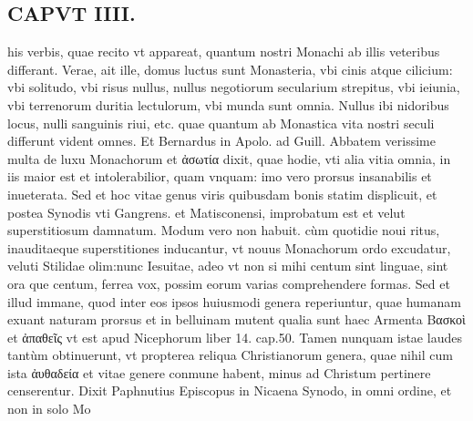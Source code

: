 \documentclass{article}
\begin{document}
\begin{pages}
\section*{CAPVT  IIII. }
\marginpar{[ p.217 ]}\pstart his verbis, quae recito vt appareat, quantum nostri Monachi ab illis veteribus differant. Verae, ait ille, domus luctus sunt Monasteria, vbi cinis atque cilicium: vbi solitudo, vbi risus nullus, nullus negotiorum secularium strepitus, vbi ieiunia, vbi terrenorum duritia lectulorum, vbi munda sunt omnia. Nullus ibi nidoribus locus, nulli sanguinis riui, etc. quae quantum ab Monastica vita nostri seculi differunt vident omnes. Et Bernardus in Apolo. ad Guill. Abbatem verissime multa de luxu Monachorum et ἀσωτία dixit, quae hodie, vti alia vitia omnia, in iis maior est et intolerabilior, quam vnquam: imo vero prorsus insanabilis et inueterata. Sed et hoc vitae genus viris quibusdam bonis statim displicuit, et postea Synodis vti Gangrens. et Matisconensi, improbatum est et velut superstitiosum damnatum. Modum vero non habuit. cùm quotidie noui ritus, inauditaeque  superstitiones inducantur, vt nouus Monachorum ordo excudatur, veluti Stilidae olim:nunc Iesuitae, adeo vt non si mihi centum sint linguae, sint ora que centum, ferrea vox, possim eorum varias comprehendere formas. Sed et illud immane, quod inter eos ipsos huiusmodi genera reperiuntur, quae humanam exuant naturam prorsus et in belluinam mutent qualia sunt haec Armenta Bασκοὶ et ἀπαθεῖς vt est apud Nicephorum liber  14. cap.50. Tamen nunquam istae laudes tantùm obtinuerunt, vt propterea reliqua Christianorum genera, quae nihil cum ista ἀυθαδεία et vitae genere conmune habent, minus ad Christum pertinere censerentur. Dixit Paphnutius Episcopus in Nicaena Synodo, in omni ordine, et non in solo Mo\pend

\end{pages}
\end{document}
